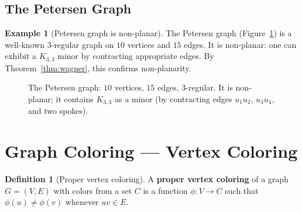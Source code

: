 \documentclass[12pt,a4paper]{article}
\theoremstyle{definition}
\newtheorem{definition}{Definition}[section]
\newtheorem{example}{Example}[section]
\theoremstyle{plain}
\theoremstyle{remark}
\begin{document}
\subsection{The Petersen Graph}

\begin{example}[Petersen graph is non-planar]\label{ex:petersen}
  The Petersen graph (Figure~\ref{fig:petersen}) is a well-known $3$-regular
  graph on $10$ vertices and $15$ edges.  It is non-planar: one can exhibit a
  $K_{3,3}$ minor by contracting appropriate edges.  By Theorem~\ref{thm:wagner},
  this confirms non-planarity.
\end{example}

\begin{figure}[htbp]
  \centering
  \caption{The Petersen graph: $10$ vertices, $15$ edges, $3$-regular.  It is
           non-planar; it contains $K_{3,3}$ as a minor (by contracting edges
           $u_1u_2$, $u_3u_4$, and two spokes).}
  \label{fig:petersen}
\end{figure}

\section{Graph Coloring — Vertex Coloring}
\label{sec:vertex-coloring}

\begin{definition}[Proper vertex coloring]\label{def:vertex-coloring}
  A \textbf{proper vertex coloring} of a graph $G=(V,E)$ with colors from a
  set $C$ is a function $\phi\colon V \to C$ such that $\phi(u) \neq \phi(v)$
  whenever $uv \in E$.
\end{definition}
\end{document}
